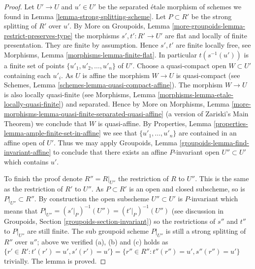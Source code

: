 \documentclass{stacks-project}
\theoremstyle{plain}
\theoremstyle{definition}
\theoremstyle{remark}
\numberwithin{equation}{subsection}
\begin{document}
\begin{proof}
Let $U' \to U$ and $u' \in U'$ be the separated \'etale morphism of schemes
we found in Lemma \ref{lemma-strong-splitting-scheme}.
Let $P \subset R'$ be the strong splitting of $R'$ over $u'$. By
More on Groupoids, Lemma \ref{more-groupoids-lemma-restrict-preserves-type}
the morphisms $s', t' : R' \to U'$ are flat and locally of finite presentation.
They are finite by assumption. Hence $s', t'$ are finite locally
free, see
Morphisms, Lemma \ref{morphisms-lemma-finite-flat}.
In particular $t(s^{-1}(u'))$ is a finite set of points
$\{u'_1, u'_2, \ldots, u'_n\}$ of $U'$. Choose a quasi-compact open
$W \subset U'$ containing each $u'_i$. As $U$ is affine the morphism
$W \to U$ is quasi-compact (see
Schemes, Lemma \ref{schemes-lemma-quasi-compact-affine}).
The morphism $W \to U$ is also locally quasi-finite (see
Morphisms, Lemma \ref{morphisms-lemma-etale-locally-quasi-finite})
and separated. Hence by
More on Morphisms,
Lemma \ref{more-morphisms-lemma-quasi-finite-separated-quasi-affine}
(a version of Zariski's Main Theorem)
we conclude that $W$ is quasi-affine. By
Properties, Lemma \ref{properties-lemma-ample-finite-set-in-affine}
we see that $\{u'_1, \ldots, u'_n\}$ are contained in an affine
open of $U'$. Thus we may apply
Groupoids, Lemma \ref{groupoids-lemma-find-invariant-affine}
to conclude that there exists an affine $P$-invariant open
$U'' \subset U'$ which contains $u'$.

\medskip\noindent
To finish the proof denote $R'' = R|_{U''}$ the restriction of $R$
to $U''$. This is the same as the restriction of $R'$ to $U''$.
As $P \subset R'$ is an open and closed subscheme, so is
$P|_{U''} \subset R''$. By construction the open subscheme $U'' \subset U'$
is $P$-invariant which means that
$P|_{U''} = (s'|_P)^{-1}(U'') = (t'|_P)^{-1}(U'')$
(see discussion in
Groupoids, Section \ref{groupoids-section-invariant})
so the restrictions of $s''$ and $t''$ to $P|_{U''}$ are still finite.
The sub groupoid scheme $P|_{U''}$ is still a strong splitting of
$R''$ over $u''$; above we verified (a), (b) and (c) holds as
$\{r' \in R': t'(r') = u', s'(r') = u'\} =
\{r'' \in R'': t''(r'') = u', s''(r'') = u'\}$ trivially.
The lemma is proved.
\end{proof}
\end{document}
